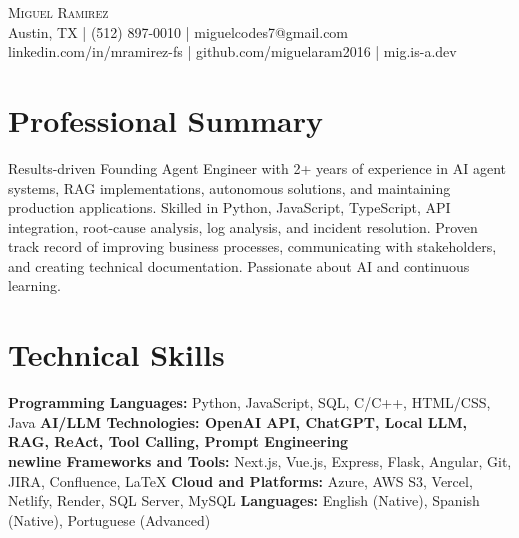 \documentclass[letterpaper,10pt]{article}
\begin{document}
\begin{center}
  {\Large \scshape Miguel Ramirez} \\ \vspace{0pt}
  Austin, TX | (512) 897-0010 | miguelcodes7@gmail.com \\ 
  linkedin.com/in/mramirez-fs | github.com/miguelaram2016 | mig.is-a.dev
\end{center}

\section*{Professional Summary}
Results-driven Founding Agent Engineer with 2+ years of experience in AI agent systems, RAG implementations, autonomous solutions, and maintaining production applications. Skilled in Python, JavaScript, TypeScript, API integration, root-cause analysis, log analysis, and incident resolution. Proven track record of improving business processes, communicating with stakeholders, and creating technical documentation. Passionate about AI and continuous learning.

\section*{Technical Skills}
\textbf{Programming Languages:} Python, JavaScript, SQL, C/C++, HTML/CSS, Java \newline
\textbf{AI/LLM Technologies: OpenAI API, ChatGPT, Local LLM, RAG, ReAct, Tool Calling, Prompt Engineering \\newline Frameworks and Tools:} Next.js, Vue.js, Express, Flask, Angular, Git, JIRA, Confluence, LaTeX \newline
\textbf{Cloud and Platforms:} Azure, AWS S3, Vercel, Netlify, Render, SQL Server, MySQL \newline
\textbf{Languages:} English (Native), Spanish (Native), Portuguese (Advanced)

\end{document}
